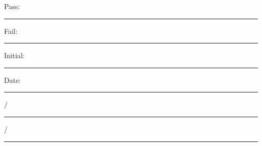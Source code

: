 
\vfill
{\large Pass: \rule{1cm}{0.15mm} \hspace{1cm} Fail: \rule{1cm}{0.15mm}} \hfill Initial: \rule{2cm}{0.15mm} \hspace{1cm} Date: \rule{0.5cm}{0.15mm}/\rule{0.5cm}{0.15mm}/\rule{1cm}{0.15mm}\\[5pt]